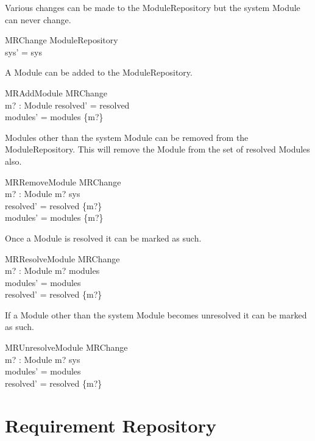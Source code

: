 \documentclass[a4paper,9pt]{article}
\begin{document}
Various changes can be made to the ModuleRepository but the system Module can never change.

\begin{schema}{MRChange}
 \Delta ModuleRepository \\
\where
 sys' = sys \\
\end{schema}

A Module can be added to the ModuleRepository.

\begin{schema}{MRAddModule}
 MRChange \\
 m? : Module
\where
 resolved' = resolved \\
 modules' = modules \cup \{m?\} 
\end{schema}

Modules other than the system Module can be removed from the ModuleRepository. This will remove the Module from the set of resolved Modules also.

\begin{schema}{MRRemoveModule}
 MRChange \\
 m? : Module
\where
  m? \neq sys \\
  resolved' = resolved \setminus \{m?\} \\
  modules' = modules \setminus \{m?\}
\end{schema}

Once a Module is resolved it can be marked as such.

\begin{schema}{MRResolveModule}
 MRChange \\
 m? : Module
\where
 m? \in modules \\
 modules' = modules \\
 resolved' = resolved \cup \{m?\}
\end{schema}

If a Module other than the system Module becomes unresolved it can be marked as such.

\begin{schema}{MRUnresolveModule}
 MRChange \\
 m? : Module
\where
 m? \neq sys \\
 modules' = modules \\
 resolved' = resolved \setminus \{m?\}
\end{schema}

\clearpage
\section{Requirement Repository}
\label{cha:supplierrepository}
\end{document}
